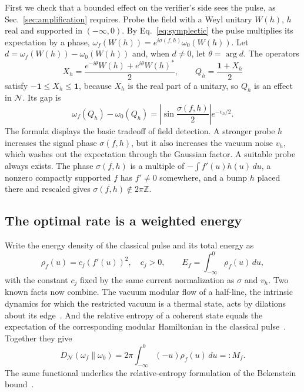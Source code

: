 \documentclass[11pt,a4paper]{article}
\newcommand{\N}{\mathcal{N}}
\begin{document}
First we check that a bounded effect on the verifier's side sees the pulse, as Sec.~\ref{sec:amplification} requires. Probe the field with a Weyl unitary $W(h)$, $h$ real and supported in $(-\infty,0)$. By Eq.~\eqref{eq:symplectic} the pulse multiplies its expectation by a phase, $\omega_f(W(h))=e^{i\sigma(f,h)}\omega_0(W(h))$. Let $d=\omega_f(W(h))-\omega_0(W(h))$ and, when $d\ne0$, let $\theta=\arg d$. The operators
\begin{equation}
X_h=\frac{e^{-i\theta}W(h)+e^{i\theta}W(h)^*}{2},
\qquad
Q_h=\frac{\mathbf{1}+X_h}{2}
\label{eq:weyl-effect}
\end{equation}
satisfy $-\mathbf{1}\le X_h\le\mathbf{1}$, because $X_h$ is the real part of a unitary, so $Q_h$ is an effect in $\N$. Its gap is
\begin{equation}
\omega_f(Q_h)-\omega_0(Q_h)
=\left|\sin\frac{\sigma(f,h)}{2}\right|
e^{-v_h/2}.
\label{eq:explicit-weyl-gap}
\end{equation}
The formula displays the basic tradeoff of field detection. A stronger probe $h$ increases the signal phase $\sigma(f,h)$, but it also increases the vacuum noise $v_h$, which washes out the expectation through the Gaussian factor. A suitable probe always exists. The phase $\sigma(f,h)$ is a multiple of $-\int f'(u)h(u)\,du$, a nonzero compactly supported $f$ has $f'\ne0$ somewhere, and a bump $h$ placed there and rescaled gives $\sigma(f,h)\notin2\pi\mathbb Z$.

\subsection{The optimal rate is a weighted energy}

Write the energy density of the classical pulse and its total energy as
\begin{equation}
\rho_f(u)=c_j(f'(u))^2,\quad c_j>0,\qquad
E_f=\int_{-\infty}^{0}\rho_f(u)\,du,
\label{eq:energy-density}
\end{equation}
with the constant $c_j$ fixed by the same current normalization as $\sigma$ and $v_h$. Two known facts now combine. The vacuum modular flow of a half-line, the intrinsic dynamics for which the restricted vacuum is a thermal state, acts by dilations about its edge~\cite{bisognano1975duality,bisognano1976duality,brunetti1993modular}. And the relative entropy of a coherent state equals the expectation of the corresponding modular Hamiltonian in the classical pulse~\cite{longo2019entropy,casini2019coherent,bostelmann2022relative}. Together they give
\begin{equation}
D_{\N}(\omega_f\|\omega_0)
=2\pi\int_{-\infty}^{0}(-u)\rho_f(u)\,du
=:M_f.
\label{eq:current-entropy}
\end{equation}
The same functional underlies the relative-entropy formulation of the Bekenstein bound~\cite{casini2008bekenstein}.
\end{document}
